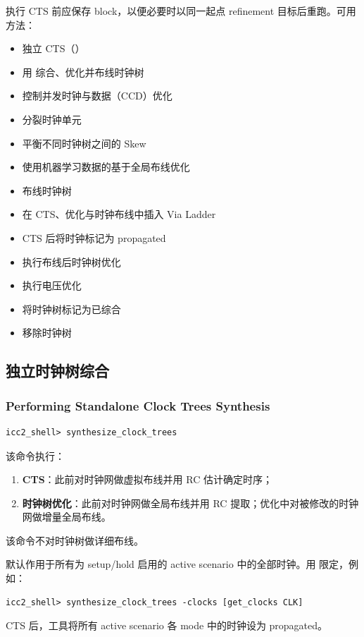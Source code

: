 执行 CTS 前应保存 block，以便必要时以同一起点 refinement 目标后重跑。可用方法：
\begin{itemize}
  \item 独立 CTS（）
  \item 用  综合、优化并布线时钟树
  \item 控制并发时钟与数据（CCD）优化
  \item 分裂时钟单元
  \item 平衡不同时钟树之间的 Skew
  \item 使用机器学习数据的基于全局布线优化
  \item 布线时钟树
  \item 在 CTS、优化与时钟布线中插入 Via Ladder
  \item CTS 后将时钟标记为 propagated
  \item 执行布线后时钟树优化
  \item 执行电压优化
  \item 将时钟树标记为已综合
  \item 移除时钟树
\end{itemize}

\subsection{独立时钟树综合}
\subsubsection*{Performing Standalone Clock Trees Synthesis}

\begin{lstlisting}
icc2_shell> synthesize_clock_trees
\end{lstlisting}
该命令执行：
\begin{enumerate}
  \item \textbf{CTS}：此前对时钟网做虚拟布线并用 RC 估计确定时序；
  \item \textbf{时钟树优化}：此前对时钟网做全局布线并用 RC 提取；优化中对被修改的时钟网做增量全局布线。
\end{enumerate}
\begin{noteBox}
该命令不对时钟树做详细布线。
\end{noteBox}
默认作用于所有为 setup/hold 启用的 active scenario 中的全部时钟。用  限定，例如：
\begin{lstlisting}
icc2_shell> synthesize_clock_trees -clocks [get_clocks CLK]
\end{lstlisting}
CTS 后，工具将所有 active scenario 各 mode 中的时钟设为 propagated。


